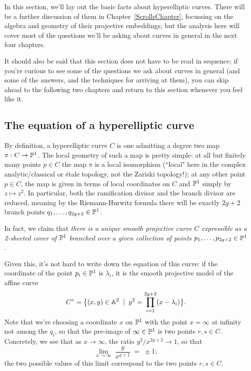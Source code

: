  In this section, we'll lay out the basic facts about hyperelliptic curves. There will be a further discussion of them in Chapter~\ref{ScrollsChapter}, focussing on the algebra and geometry of their projective embeddings; but the analysis here will cover most of the questions we'll be asking about curves in general in the next four chapters. 
 
 It should also be said that this section does not have to be read in sequence; if you're curious to see some of the questions we ask about curves in general (and some of the answers, and the techniques for arriving at them), you can skip ahead to the following two chapters and return to this section whenever you feel like it.
 
 \subsection{The equation of a hyperelliptic curve}
 
  By definition, a hyperelliptic curve $C$ is one admitting a degree two map $\pi : C \to \PP^1$. The local geometry of such a map is pretty simple: at all but finitely many points $p \in C$ the map $\pi$ is a local isomorphism (``local" here in the complex analytic/classical or \'etale topology, not the Zariski topology!); at any other point $p \in C$, the map is given in terms of local coordinates on $C$ and $\PP^1$ simply by $z \mapsto z^2$. In particular, both the ramification divisor and the branch divisor are reduced, meaning by the Riemann-Hurwitz formula there will be exactly $2g+2$ branch points $q_1,\dots,q_{2g+2} \in \PP^1$.
  
  In fact, we claim that \emph{there is a unique smooth projective curve $C$ expressible as a 2-sheeted cover of $\PP^1$ branched over a given collection of points $p_1,\dots,p_{2g+2} \in \PP^1$}. 
  
  Given this, it's not hard to write down the equation of this curve: if the coordinate of the point $p_i \in \PP^1$ is $\lambda_i$, it is the smooth projective model of the affine curve 
  $$
C^\circ = \big\{ (x,y) \in \AA^2 \; \mid \; y^2 = \prod_{i=1}^{2g+2} (x - \lambda_i) \big\}.
$$ 
Note that we're choosing a coordinate $x$ on $\PP^1$ with the point $x = \infty$ at infinity not among the $q_i$, so that the pre-image of $\infty \in \PP^1$ is two points $r, s \in C$. Concretely, we see that as $x \to \infty$, the ratio $y^2/x^{2g+2} \to 1$, so that 
$$
\lim_{x \to \infty} \; \frac{y}{x^{g+1}} \; = \; \pm 1;
$$
  the two possible values of this limit correspond to the two points $r,s \in C$.
  
